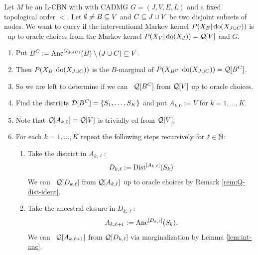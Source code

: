 \begin{Alg}[ID-algorithm] \label{alg:id}
    Let $M$ be an L-CBN with with \observational CADMG $G=(J,V,E,L)$ and a fixed topological order $<$.
    Let $\emptyset \neq B \subseteq V$ and $C \subseteq J \cup V$ be two disjoint subsets of nodes. 
    We want to query if the interventional Markov kernel $P(X_B|\operatorname{do}(X_{J \cup C}))$ is \trackable\ up to oracle choices
    from the \observational Markov kernel $P(X_V|\operatorname{do}(X_J))=\mathcal{Q}[V]$ and $G$.
    \begin{enumerate}
        \item Put $B^C:=\mathrm{Anc}^{G_{\operatorname{do}(C)}}(B) \setminus (J \cup C) \subseteq V$. 
        \item[] Then $P(X_B|\operatorname{do}(X_{J \cup C}))$ is the 
            $B$-marginal of $P(X_{B^C}|\operatorname{do}(X_{J \cup C})) = \mathcal{Q}[B^C]$.
        \item[] So we are left to determine if we can \track\ $\mathcal{Q}[B^C]$ from $\mathcal{Q}[V]$ up to oracle choices.
        \item Find the districts $\mathcal{D}[B^C]=\left \{ S_1,\dots,S_K\right \}$ and put $A_{k,0}:=V$ for $k=1,\dots,K$.
        \item[] Note that $\mathcal{Q}[A_{k,0}]=\mathcal{Q}[V]$ is trivially \track ed from $\mathcal{Q}[V]$.
        \item For each $k=1,\dots, K$ repeat the following steps recursively for $\ell \in \mathbb{N}$:
            \begin{enumerate}
                \item Take the district in $A_{k,\ell}$:
                        \[ D_{k,\ell} := \mathrm{Dist}^{[A_{k,\ell}]}(S_k) \]
                        We can \track\ $\mathcal{Q}[D_{k,\ell}]$ from $\mathcal{Q}[A_{k,\ell}]$ up to oracle choices by Remark \ref{rem:Q-dist-ident}.
                \item Take the ancestral closure in $D_{k,\ell}$: 
                    \[ A_{k,\ell+1}:=\mathrm{Anc}^{[D_{k,\ell}]}(S_k). \] 
                    We can \track\ $\mathcal{Q}[A_{k,\ell+1}]$ from $\mathcal{Q}[D_{k,\ell}]$ via marginalization by Lemma \ref{lem:int-anc}.


\end{enumerate}
\end{enumerate}
\end{Alg}
